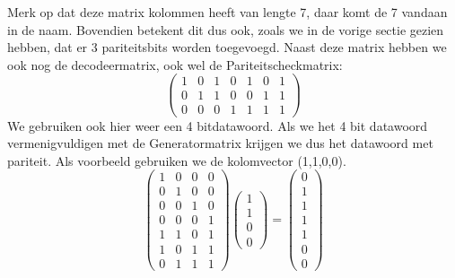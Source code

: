 \documentclass[a4paper]{article}
\begin{document}
Merk op dat deze matrix kolommen heeft van lengte 7, daar komt de 7 vandaan in de naam. Bovendien betekent dit dus ook, zoals we in de vorige sectie gezien hebben, dat er 3 pariteitsbits worden toegevoegd. Naast deze matrix hebben we ook nog de decodeermatrix, ook wel de Pariteitscheckmatrix:
\begin{equation*}
	\begin{pmatrix}
	1&0&1&0&1&0&1 \\
	0&1&1&0&0&1&1 \\
	0&0&0&1&1&1&1
	\end{pmatrix}
\end{equation*}
We gebruiken ook hier weer een 4 bitdatawoord.
Als we het 4 bit datawoord vermenigvuldigen met de Generatormatrix krijgen we dus het datawoord met pariteit. Als voorbeeld gebruiken we de kolomvector (1,1,0,0).\\
\begin{equation*}
	\begin{pmatrix}
		1&0&0&0 \\
		0&1&0&0 \\
		0&0&1&0 \\
		0&0&0&1 \\
		1&1&0&1 \\
		1&0&1&1 \\
		0&1&1&1
	\end{pmatrix}
	\begin{pmatrix}
		1\\1\\0\\0
	\end{pmatrix}
	= 
	\begin{pmatrix}
		0\\1\\1\\1\\1\\0\\0
	\end{pmatrix}
\end{equation*}
\end{document}
